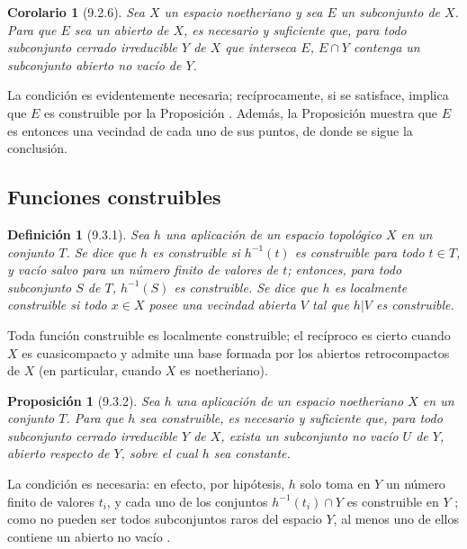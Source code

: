 \documentclass[10pt,oneside,openany]{book}
\theoremstyle{egaenv}\newtheorem*{env}{---}
\theoremstyle{egastatement}
\newtheorem*{proposition}{Proposición}
\newtheorem*{corollary}{Corolario}
\theoremstyle{egadescription}
\newtheorem*{definition}{Definición}
\begin{document}
\begin{corollary}[9.2.6]
\label{0.9.2.6}
\label{0.9.2.6-fr}
Sea $X$ un espacio noetheriano y sea $E$ un subconjunto de $X$.
Para que $E$ sea un abierto de $X$, es necesario y suficiente que, para todo subconjunto cerrado irreducible $Y$ de $X$ que interseca $E$, $E\cap Y$ contenga un subconjunto abierto no vacío de $Y$.
\end{corollary}


La condición es evidentemente necesaria; recíprocamente, si se satisface, implica que $E$ es construible por la Proposición .
Además, la Proposición  muestra que $E$ es entonces una vecindad de cada uno de sus puntos, de donde se sigue la conclusión.


\subsection{Funciones construibles}
\label{subsection:0.9.3}
\label{subsection:0.9.3-fr}

\begin{definition}[9.3.1]
\label{0.9.3.1}
\label{0.9.3.1-fr}
Sea $h$ una aplicación de un espacio topológico $X$ en un conjunto $T$.
Se dice que $h$ es construible si $h^{-1}(t)$ es construible para todo $t\in T$, y vacío salvo para un número finito de valores de $t$; entonces, para todo subconjunto $S$ de $T$, $h^{-1}(S)$ es construible.
Se dice que $h$ es localmente construible si todo $x\in X$ posee una vecindad abierta $V$ tal que $h|V$ es construible.
\end{definition}

Toda función construible es localmente construible; el recíproco es cierto cuando $X$ es cuasicompacto y admite una base formada por los abiertos retrocompactos de $X$ (en particular, cuando $X$ es noetheriano).

\begin{proposition}[9.3.2]
\label{0.9.3.2}
\label{0.9.3.2-fr}
Sea $h$ una aplicación de un espacio noetheriano $X$ en un conjunto $T$.
Para que $h$ sea construible, es necesario y suficiente que, para todo subconjunto cerrado irreducible $Y$ de $X$, exista un subconjunto no vacío $U$ de $Y$, abierto respecto de $Y$, sobre el cual $h$ sea constante.
\end{proposition}


La condición es necesaria: en efecto, por hipótesis, $h$ solo toma en $Y$ un número finito de valores $t_i$, y cada uno de los conjuntos
$h^{-1}(t_i)\cap Y$ es construible en $Y$ ; como no pueden ser todos subconjuntos raros del espacio $Y$, al menos uno de ellos contiene un abierto no vacío .
\end{document}
